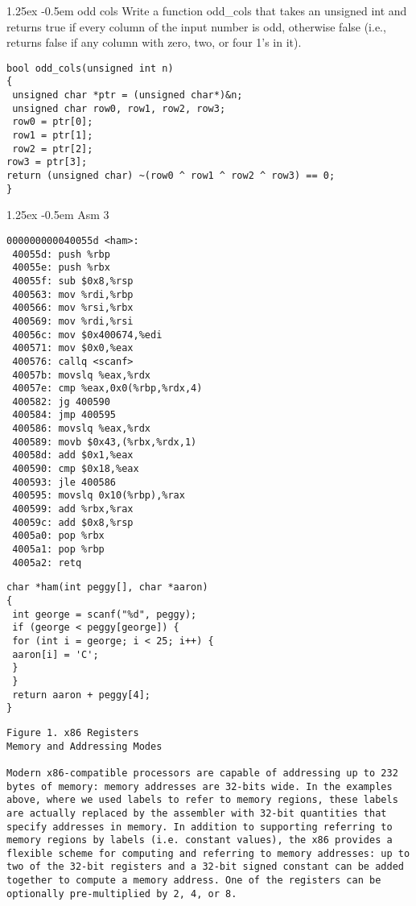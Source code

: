 \documentclass[10pt]{article}
\makeatletter
\newlength{\norm}
\newlength{\nrm}
\newlength{\sm}
\renewcommand{\paragraph}{%
  \@startsection{paragraph}{4}%
  {\z@}{1.25ex \@plus 2pt \@minus 2pt}{-0.5em}%
  {\fontsize{\f@size}{\nrm}\normalfont\bfseries}%
}
\makeatother
\begin{document}
{\begin{multicols*}{5}
\paragraph{odd cols}
Write a function
odd\_cols that takes an unsigned int and returns true if every column of the input number
is odd, otherwise false (i.e., returns false if any column with zero, two, or four 1’s in it). 

\begin{lstlisting}[breaklines=true,columns=fullflexible]
bool odd_cols(unsigned int n)
{
 unsigned char *ptr = (unsigned char*)&n;
 unsigned char row0, row1, row2, row3;
 row0 = ptr[0];
 row1 = ptr[1];
 row2 = ptr[2];
row3 = ptr[3];
return (unsigned char) ~(row0 ^ row1 ^ row2 ^ row3) == 0;
}
\end{lstlisting}

\paragraph{Asm 3}

\begin{lstlisting}[breaklines=true,columns=fullflexible]
000000000040055d <ham>:
 40055d: push %rbp
 40055e: push %rbx
 40055f: sub $0x8,%rsp
 400563: mov %rdi,%rbp
 400566: mov %rsi,%rbx
 400569: mov %rdi,%rsi
 40056c: mov $0x400674,%edi
 400571: mov $0x0,%eax
 400576: callq <scanf>
 40057b: movslq %eax,%rdx
 40057e: cmp %eax,0x0(%rbp,%rdx,4)
 400582: jg 400590
 400584: jmp 400595
 400586: movslq %eax,%rdx
 400589: movb $0x43,(%rbx,%rdx,1)
 40058d: add $0x1,%eax
 400590: cmp $0x18,%eax
 400593: jle 400586
 400595: movslq 0x10(%rbp),%rax
 400599: add %rbx,%rax
 40059c: add $0x8,%rsp
 4005a0: pop %rbx
 4005a1: pop %rbp
 4005a2: retq
\end{lstlisting}

\begin{lstlisting}[breaklines=true,columns=fullflexible]
char *ham(int peggy[], char *aaron)
{
 int george = scanf("%d", peggy);
 if (george < peggy[george]) {
 for (int i = george; i < 25; i++) {
 aaron[i] = 'C';
 }
 }
 return aaron + peggy[4];
}
\end{lstlisting}

\begin{lstlisting}[breaklines=true,columns=fullflexible]
Figure 1. x86 Registers
Memory and Addressing Modes

Modern x86-compatible processors are capable of addressing up to 232 bytes of memory: memory addresses are 32-bits wide. In the examples above, where we used labels to refer to memory regions, these labels are actually replaced by the assembler with 32-bit quantities that specify addresses in memory. In addition to supporting referring to memory regions by labels (i.e. constant values), the x86 provides a flexible scheme for computing and referring to memory addresses: up to two of the 32-bit registers and a 32-bit signed constant can be added together to compute a memory address. One of the registers can be optionally pre-multiplied by 2, 4, or 8.


\end{lstlisting}
\end{multicols*}}
\end{document}
